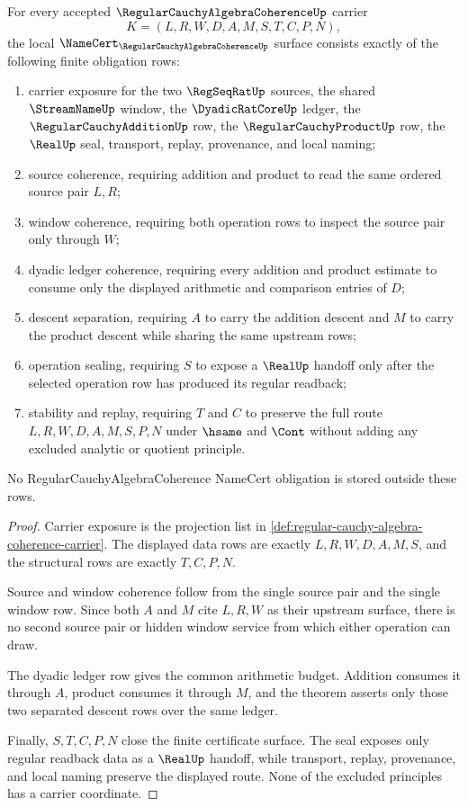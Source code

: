 \begin{theorem}
\label{thm:regular-cauchy-algebra-coherence-namecert-obligations}
For every accepted $\RegularCauchyAlgebraCoherenceUp$ carrier
$$
K=(L,R,W,D,A,M,S,T,C,P,N),
$$
the local $\NameCert_{\RegularCauchyAlgebraCoherenceUp}$ surface consists exactly of the following finite obligation rows:
\begin{enumerate}
\item carrier exposure for the two $\RegSeqRatUp$ sources, the shared $\StreamNameUp$ window, the $\DyadicRatCoreUp$ ledger, the $\RegularCauchyAdditionUp$ row, the $\RegularCauchyProductUp$ row, the $\RealUp$ seal, transport, replay, provenance, and local naming;
\item source coherence, requiring addition and product to read the same ordered source pair $L,R$;
\item window coherence, requiring both operation rows to inspect the source pair only through $W$;
\item dyadic ledger coherence, requiring every addition and product estimate to consume only the displayed arithmetic and comparison entries of $D$;
\item descent separation, requiring $A$ to carry the addition descent and $M$ to carry the product descent while sharing the same upstream rows;
\item operation sealing, requiring $S$ to expose a $\RealUp$ handoff only after the selected operation row has produced its regular readback;
\item stability and replay, requiring $T$ and $C$ to preserve the full route $L,R,W,D,A,M,S,P,N$ under $\hsame$ and $\Cont$ without adding any excluded analytic or quotient principle.
\end{enumerate}
No RegularCauchyAlgebraCoherence NameCert obligation is stored outside these rows.
\end{theorem}
\begin{proof}
Carrier exposure is the projection list in \autoref{def:regular-cauchy-algebra-coherence-carrier}. The displayed data rows are exactly $L,R,W,D,A,M,S$, and the structural rows are exactly $T,C,P,N$.

Source and window coherence follow from the single source pair and the single window row. Since both $A$ and $M$ cite $L,R,W$ as their upstream surface, there is no second source pair or hidden window service from which either operation can draw.

The dyadic ledger row gives the common arithmetic budget. Addition consumes it through $A$, product consumes it through $M$, and the theorem asserts only those two separated descent rows over the same ledger.

Finally, $S,T,C,P,N$ close the finite certificate surface. The seal exposes only regular readback data as a $\RealUp$ handoff, while transport, replay, provenance, and local naming preserve the displayed route. None of the excluded principles has a carrier coordinate.
\end{proof}

